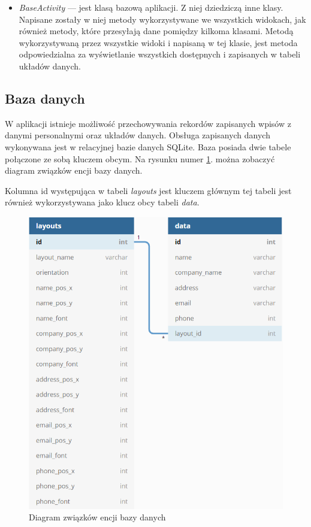 \documentclass[a4paper,12pt, twoside]{article}
\begin{document}
\begin{itemize}
    	    \item \textit{BaseActivity} — jest klasą bazową aplikacji. Z niej dziedziczą inne klasy. Napisane zostały w niej metody wykorzystywane we wszystkich widokach, jak również metody, które przesyłają dane pomiędzy kilkoma klasami. Metodą wykorzystywaną przez wszystkie widoki i napisaną w tej klasie, jest metoda odpowiedzialna za wyświetlanie wszystkich dostępnych i zapisanych w tabeli układów danych.
    	\end{itemize}
    
        \subsection{Baza danych}
        W aplikacji istnieje możliwość przechowywania rekordów zapisanych wpisów z danymi personalnymi oraz układów danych. Obsługa zapisanych danych wykonywana jest w relacyjnej bazie danych SQLite. Baza posiada dwie tabele połączone ze sobą kluczem obcym. Na rysunku numer \ref{fig:database}. można zobaczyć diagram związków encji bazy danych. 
        
        Kolumna id występująca w tabeli \textit{layouts} jest kluczem głównym tej tabeli jest również wykorzystywana jako klucz obcy tabeli \textit{data}. 
        
        \begin{figure}[H]
    	        \centering
    			\includegraphics[width=12cm]{images/rys_11baza.png}
    			\caption{Diagram związków encji bazy danych}
                \label{fig:database}
    	\end{figure}
    	
\end{document}
